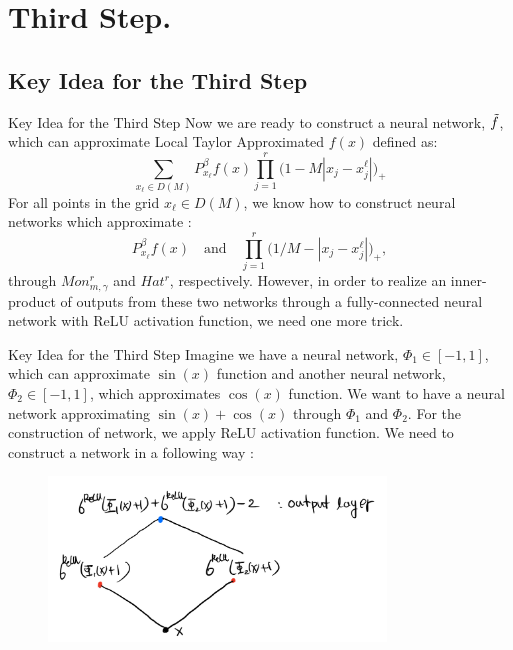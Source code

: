 \documentclass{if-beamer}
\begin{document}
\section{Third Step.}
\subsection{Key Idea for the Third Step}
\begin{frame}{Key Idea for the Third Step}
    Now we are ready to construct a neural network, $\Tilde{f}$, which can approximate Local Taylor Approximated $f(x)$ defined as:
    \begin{equation*}
        \sum_{x_{\ell}\in D(M)}P_{x_{\ell}}^{\beta}f(x)\prod_{j=1}^{r}\bigg( 1- M|x_{j}-x_{j}^{\ell}| \bigg)_{+} 
    \end{equation*}
    For all points in the grid $x_{\ell}\in D(M)$, we know how to construct neural networks which approximate : 
    \begin{equation*}
        P_{x_{\ell}}^{\beta}f(x) \quad \text{and} \quad \prod_{j=1}^{r}\big( 1/M - |x_{j}-x_{j}^{\ell}| \big)_{+},
    \end{equation*}
    through $Mon_{m,\gamma}^{r}$ and $Hat^{r}$, respectively.
    However, in order to realize an inner-product of outputs from these two networks through a fully-connected neural network with ReLU activation function, we need one more trick.
\end{frame}

\begin{frame}{Key Idea for the Third Step}
    Imagine we have a neural network, $\Phi_{1}\in [-1,1]$, which can approximate $\sin(x)$ function and  another neural network, $\Phi_{2}\in [-1,1]$, which approximates $\cos(x)$ function. 
    We want to have a neural network approximating $\sin(x)+\cos(x)$ through $\Phi_{1}$ and $\Phi_{2}$. For the construction of network, we apply ReLU activation function. 
    We need to construct a network in a following way : 
    \begin{figure}[htbp]
        \includegraphics[width=0.8\textwidth]{Shift_Scale.png}
    \label{fig:figure7}
\end{figure}
\end{frame}
\end{document}
